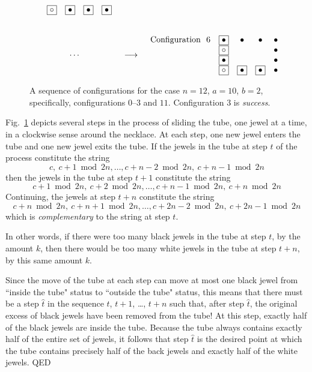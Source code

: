 \documentclass{article}
\begin{document}
\begin{figure}[htb]
\[\begin{array}{ccc}
\begin{array}{rcccc}
& \fbox{$\circ$} &  \fbox{$\bullet$} & \fbox{$\bullet$} & \fbox{$\bullet$}
\end{array}
 \\  \\  \\
\cdots & \longrightarrow &
\begin{array}{rcccc}
\mbox{Configuration } \ 6 &
 \fbox{$\bullet$} & \bullet & \bullet & \bullet  \\
& \fbox{$\circ$}   &                      &                      & \bullet  \\
&  \fbox{$\bullet$} &                      &                      & \bullet  \\
& \fbox{$\circ$}    &   \fbox{$\bullet$}          &    \fbox{$\bullet$}   & \bullet \\
\end{array}
\end{array}
\]
\caption{A sequence of configurations for the case $n=12$, $a = 10$, $b=2$, specifically, configurations $0$--$3$ and $11$.  Configuration $3$ is {\em success}.}
\label{fig:necklace}
\end{figure}

Fig.~\ref{fig:necklace} depicts several steps in the process of sliding the tube, one jewel at a time, in a clockwise sense around the necklace.  At each step, one new jewel enters the tube and one new jewel exits the tube.  If the jewels in the tube at step $t$ of the process constitute the string
\[ c, \ c+1 \bmod 2n, \ldots,  c+n-2 \bmod 2n, \ c+n-1 \bmod 2n \]
then the jewels in the tube at step $t+1$ constitute the string
\[ c+1 \bmod 2n,  \ c+2 \bmod 2n, \ldots,  c+n-1 \bmod 2n , \ c+n \bmod 2n \]
Continuing, the jewels at step $t + n$ constitute the string
\[ c+n \bmod 2n, \ c+n+1 \bmod 2n,   \ldots,  c+ 2n-2 \bmod 2n , \ c+2n-1 \bmod 2n \]
which is {\em complementary} to the string at step $t$.

\smallskip

In other words, if there were too many black jewels in the tube at step $t$, by the amount $k$, then there would be too many white jewels in the tube at step $t+n$, by this same amount $k$.

\smallskip

Since the move of the tube at each step can move at most one black jewel from ``inside the tube" status to ``outside the tube" status, this means that there must be a step $\hat{t}$ in the sequence $t$, $t+1$, \ldots, $t+n$ such that, after step $\hat{t}$, the original excess of black jewels have been removed from the tube!  At this step, exactly half of the black jewels are inside the tube.  Because the tube always contains exactly half of the entire set of jewels, it follows that step $\hat{t}$ is the desired point at which the tube contains precisely half of the back jewels and exactly half of the white jewels.  QED
\end{document}
